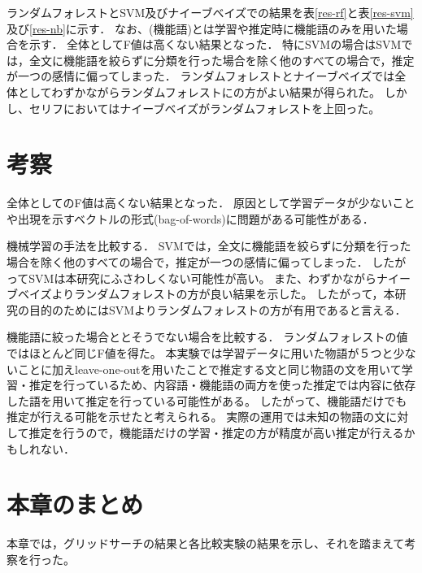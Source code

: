 ランダムフォレストとSVM及びナイーブベイズでの結果を表\ref{res-rf}と表\ref{res-svm}及び\ref{res-nb}に示す．
なお、(機能語)とは学習や推定時に機能語のみを用いた場合を示す．
全体としてF値は高くない結果となった．
特にSVMの場合はSVMでは，全文に機能語を絞らずに分類を行った場合を除く他のすべての場合で，推定が一つの感情に偏ってしまった．
ランダムフォレストとナイーブベイズでは全体としてわずかながらランダムフォレストにの方がよい結果が得られた。
しかし、セリフにおいてはナイーブベイズがランダムフォレストを上回った。


\section{考察}
全体としてのF値は高くない結果となった．
原因として学習データが少ないことや出現を示すベクトルの形式(bag-of-words)に問題がある可能性がある．

機械学習の手法を比較する．
SVMでは，全文に機能語を絞らずに分類を行った場合を除く他のすべての場合で，推定が一つの感情に偏ってしまった．
したがってSVMは本研究にふさわしくない可能性が高い。
また、わずかながらナイーブベイズよりランダムフォレストの方が良い結果を示した。
したがって，本研究の目的のためにはSVMよりランダムフォレストの方が有用であると言える．

機能語に絞った場合ととそうでない場合を比較する．
ランダムフォレストの値ではほとんど同じF値を得た。
本実験では学習データに用いた物語が５つと少ないことに加えleave-one-outを用いたことで推定する文と同じ物語の文を用いて学習・推定を行っているため、内容語・機能語の両方を使った推定では内容に依存した語を用いて推定を行っている可能性がある。
したがって、機能語だけでも推定が行える可能を示せたと考えられる。
実際の運用では未知の物語の文に対して推定を行うので，機能語だけの学習・推定の方が精度が高い推定が行えるかもしれない．



\section{本章のまとめ}
本章では，グリッドサーチの結果と各比較実験の結果を示し、それを踏まえて考察を行った。



